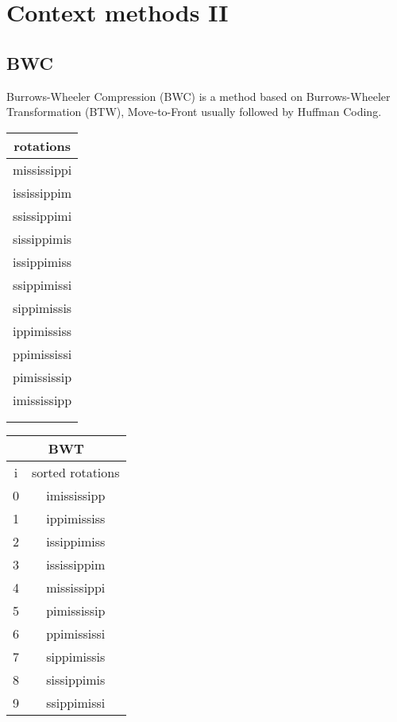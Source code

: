 \chapter{Context methods II}

\section{BWC}

Burrows-Wheeler Compression (BWC) is a method based on Burrows-Wheeler Transformation (BTW), Move-to-Front usually followed by Huffman Coding.

\begin{figure*}
  \begin{center}
  \begin{tabular}{c}
    \\
    \hline
    rotations \\
    \hline
    mississippi \\
    ississippim \\
    ssissippimi \\
    sissippimis \\
    issippimiss \\
    ssippimissi \\
    sippimissis \\
    ippimississ \\
    ppimississi \\
    pimississip \\
    imississipp \\
    \hline
    \\
    \\
  \end{tabular}
  \hspace*{0.5cm}
  \begin{tabular}{c|c}
    \multicolumn{2}{c}{BWT} \\
    \hline
    i & sorted rotations \\
    \hline
    0 & imississipp \\
    1 & ippimississ \\
    2 & issippimiss \\
    3 & ississippim \\
    4 & mississippi \\
    5 & pimississip \\
    6 & ppimississi \\
    7 & sippimissis \\
    8 & sissippimis \\
    9 & ssippimissi \\

\end{tabular}
\end{center}
\end{figure*}
